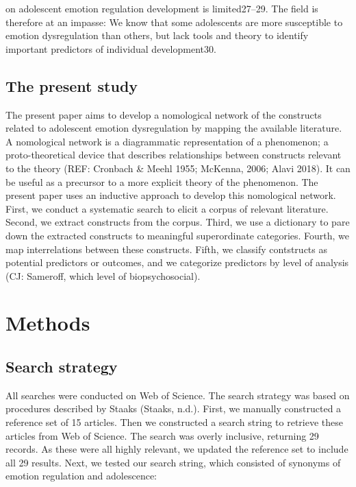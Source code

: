 \documentclass[
  english,
  man]{apa6}
\begin{document}
on adolescent emotion regulation development is limited27--29. The field is therefore at an impasse: We know that some adolescents are more susceptible to emotion dysregulation than others, but lack tools and theory to identify important predictors of individual development30.

\hypertarget{the-present-study}{%
\subsection{The present study}\label{the-present-study}}

The present paper aims to develop a nomological network of the constructs related to adolescent emotion dysregulation by mapping the available literature. A nomological network is a diagrammatic representation of a phenomenon; a proto-theoretical device that describes relationships between constructs relevant to the theory (REF: Cronbach \& Meehl 1955; McKenna, 2006; Alavi 2018). It can be useful as a precursor to a more explicit theory of the phenomenon. The present paper uses an inductive approach to develop this nomological network. First, we conduct a systematic search to elicit a corpus of relevant literature. Second, we extract constructs from the corpus. Third, we use a dictionary to pare down the extracted constructs to meaningful superordinate categories. Fourth, we map interrelations between these constructs. Fifth, we classify contstructs as potential predictors or outcomes, and we categorize predictors by level of analysis (CJ: Sameroff, which level of biopsychosocial).

\hypertarget{methods}{%
\section{Methods}\label{methods}}

\hypertarget{search-strategy}{%
\subsection{Search strategy}\label{search-strategy}}

All searches were conducted on Web of Science. The search strategy was based on procedures described by Staaks (Staaks, n.d.). First, we manually constructed a reference set of 15 articles. Then we constructed a search string to retrieve these articles from Web of Science. The search was overly inclusive, returning 29 records. As these were all highly relevant, we updated the reference set to include all 29 results. Next, we tested our search string, which consisted of synonyms of emotion regulation and adolescence:
\end{document}
